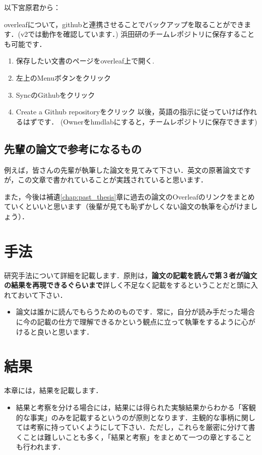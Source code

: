 \documentclass[dvipdfmx,autodetect-engine]{jsreport}
\begin{document}
以下宮原君から：

overleafについて，githubと連携させることでバックアップを取ることができます．(v2では動作を確認しています．)
浜田研のチームレポジトリに保存することも可能です．
\begin{enumerate}
\item 保存したい文書のページをoverleaf上で開く.
\item 左上のMenuボタンをクリック
\item SyncのGithubをクリック
\item Create a Github repositoryをクリック
以後，英語の指示に従っていけば作れるはずです．
(Ownerをhmdlabにすると，チームレポジトリに保存できます)
\end{enumerate}


\section{先輩の論文で参考になるもの}

例えば，皆さんの先輩が執筆した論文\cite{pmid29315213,pmid29040374}を見てみて下さい．英文の原著論文ですが，この文章で書かれていることが実践されていると思います．

また，今後は補遺\ref{chap:past_thesis}章に過去の論文のOverleafのリンクをまとめていくといいと思います（後輩が見ても恥ずかしくない論文の執筆を心がけましょう）．

\chapter{手法}

研究手法について詳細を記載します．原則は，\textbf{論文の記載を読んで第３者が論文の結果を再現できるぐらいまで}詳しく不足なく記載をするということだと頭に入れておいて下さい．

\begin{itemize}
\item 論文は誰かに読んでもらうためのものです．常に，自分が読み手だった場合に今の記載の仕方で理解できるかという観点に立って執筆をするように心がけると良いと思います．
\end{itemize}

\chapter{結果}\label{sec:result}

本章には，結果を記載します．
\begin{itemize}
\item 結果と考察を分ける場合には，結果には得られた実験結果からわかる「客観的な事実」のみを記載するというのが原則となります．主観的な事柄に関しては考察に持っていくようにして下さい．ただし，これらを厳密に分けて書くことは難しいことも多く，「結果と考察」をまとめて一つの章とすることも行われます．
\end{itemize}
\end{document}
